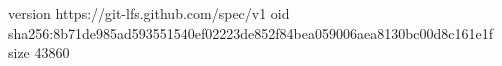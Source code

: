 version https://git-lfs.github.com/spec/v1
oid sha256:8b71de985ad593551540ef02223de852f84bea059006aea8130bc00d8c161e1f
size 43860
